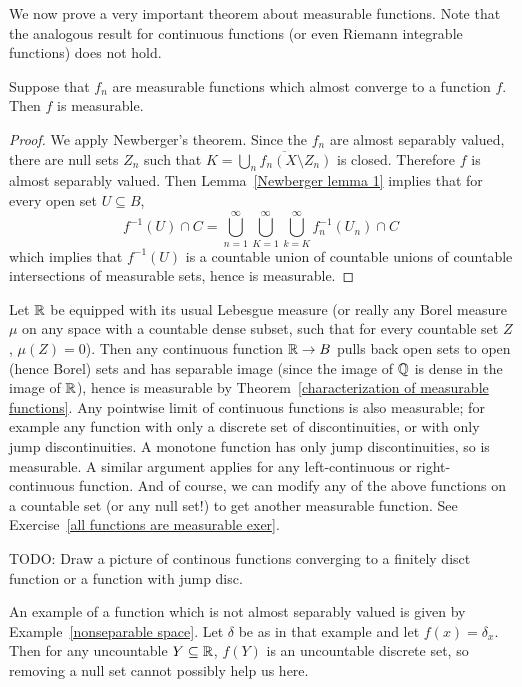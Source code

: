 We now prove a very important theorem about measurable functions. Note that the analogous result for continuous functions (or even Riemann integrable functions) does not hold.

\begin{theorem}
\label{measurable functions converge}
Suppose that $f_{n}$ are measurable functions which almost converge to a function $f$. Then $f$ is measurable.
\end{theorem}
\begin{proof}
We apply Newberger's theorem.
Since the $f_{n}$ are almost separably valued, there are null sets $Z_{n}$ such that $K = \overline{\bigcup_{n} f_{n}(X \setminus Z_{n})}$ is closed.
Therefore $f$ is almost separably valued. Then Lemma~\ref{Newberger lemma 1} implies that for every open set $U \subseteq B$,
\[f^{-1}(U) \cap C = \bigcup_{n=1}^{\infty} \bigcup_{K=1}^{\infty} \bigcup_{k=K}^{\infty} f_{n}^{-1}(U_{n}) \cap C\]
which implies that $f^{-1}(U)$ is a countable union of countable unions of countable intersections of measurable sets, hence is measurable.
\end{proof}

\begin{subsec}
\label{all functions are measurable}
Let $\mathbb{R}$ be equipped with its usual Lebesgue measure (or really any Borel measure $\mu$ on any space with a countable dense subset, such that for every countable set $Z$, $\mu(Z) = 0$).
Then any continuous function $\mathbb{R} \to B$ pulls back open sets to open (hence Borel) sets and has separable image (since the image of $\mathbb{Q}$ is dense in the image of $\mathbb{R}$), hence is measurable by Theorem~\ref{characterization of measurable functions}.
Any pointwise limit of continuous functions is also measurable; for example any function with only a discrete set of discontinuities, or with only jump discontinuities.
A monotone function has only jump discontinuities, so is measurable. A similar argument applies for any left-continuous or right-continuous function.
And of course, we can modify any of the above functions on a countable set (or any null set!) to get another measurable function.
See Exercise~\ref{all functions are measurable exer}.

TODO: Draw a picture of continous functions converging to a finitely disct function or a function with jump disc.
\end{subsec}

\begin{example}
\label{nonseparable function}
An example of a function which is not almost separably valued is given by Example~\ref{nonseparable space}.
Let $\delta$ be as in that example and let $f(x) = \delta_x$. Then for any uncountable $Y \subseteq \mathbb{R}$, $f(Y)$ is an uncountable discrete set, so removing a null set cannot possibly help us here.
\end{example}

